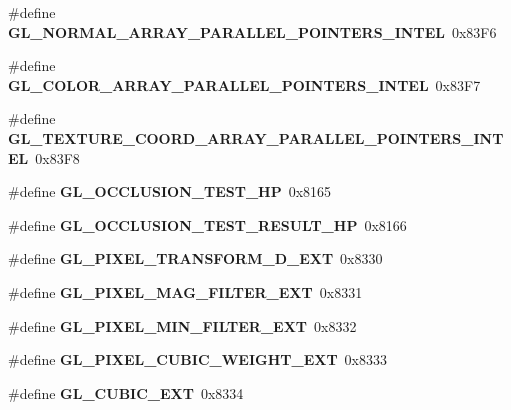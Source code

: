 \begin{DoxyCompactItemize}
\item 
\#define {\bfseries G\+L\+\_\+\+N\+O\+R\+M\+A\+L\+\_\+\+A\+R\+R\+A\+Y\+\_\+\+P\+A\+R\+A\+L\+L\+E\+L\+\_\+\+P\+O\+I\+N\+T\+E\+R\+S\+\_\+\+I\+N\+T\+E\+L}~0x83\+F6\label{_s_d_l__opengl_8h_af998ad9c6b8192793730388fa88a1c14}

\item 
\#define {\bfseries G\+L\+\_\+\+C\+O\+L\+O\+R\+\_\+\+A\+R\+R\+A\+Y\+\_\+\+P\+A\+R\+A\+L\+L\+E\+L\+\_\+\+P\+O\+I\+N\+T\+E\+R\+S\+\_\+\+I\+N\+T\+E\+L}~0x83\+F7\label{_s_d_l__opengl_8h_a2d930d0fab00c3cb5fc5a3f1e2e586d4}

\item 
\#define {\bfseries G\+L\+\_\+\+T\+E\+X\+T\+U\+R\+E\+\_\+\+C\+O\+O\+R\+D\+\_\+\+A\+R\+R\+A\+Y\+\_\+\+P\+A\+R\+A\+L\+L\+E\+L\+\_\+\+P\+O\+I\+N\+T\+E\+R\+S\+\_\+\+I\+N\+T\+E\+L}~0x83\+F8\label{_s_d_l__opengl_8h_a0a9de9b6448574f74ff594a64c760748}

\item 
\#define {\bfseries G\+L\+\_\+\+O\+C\+C\+L\+U\+S\+I\+O\+N\+\_\+\+T\+E\+S\+T\+\_\+\+H\+P}~0x8165\label{_s_d_l__opengl_8h_a22daf1b41f916066c813394a809f5109}

\item 
\#define {\bfseries G\+L\+\_\+\+O\+C\+C\+L\+U\+S\+I\+O\+N\+\_\+\+T\+E\+S\+T\+\_\+\+R\+E\+S\+U\+L\+T\+\_\+\+H\+P}~0x8166\label{_s_d_l__opengl_8h_a48c637394588fad4caebda85852798e4}

\item 
\#define {\bfseries G\+L\+\_\+\+P\+I\+X\+E\+L\+\_\+\+T\+R\+A\+N\+S\+F\+O\+R\+M\+\_\+D\+\_\+\+E\+X\+T}~0x8330\label{_s_d_l__opengl_8h_a6c4074d4f3e0b6aa35113ffcad89cbd4}

\item 
\#define {\bfseries G\+L\+\_\+\+P\+I\+X\+E\+L\+\_\+\+M\+A\+G\+\_\+\+F\+I\+L\+T\+E\+R\+\_\+\+E\+X\+T}~0x8331\label{_s_d_l__opengl_8h_aa536f703a10c6e1c98609d18eb5b27bb}

\item 
\#define {\bfseries G\+L\+\_\+\+P\+I\+X\+E\+L\+\_\+\+M\+I\+N\+\_\+\+F\+I\+L\+T\+E\+R\+\_\+\+E\+X\+T}~0x8332\label{_s_d_l__opengl_8h_ac2b3ac2968a9f963442a37068216c5b0}

\item 
\#define {\bfseries G\+L\+\_\+\+P\+I\+X\+E\+L\+\_\+\+C\+U\+B\+I\+C\+\_\+\+W\+E\+I\+G\+H\+T\+\_\+\+E\+X\+T}~0x8333\label{_s_d_l__opengl_8h_a5454d12e79b181328af7522c69894232}

\item 
\#define {\bfseries G\+L\+\_\+\+C\+U\+B\+I\+C\+\_\+\+E\+X\+T}~0x8334\label{_s_d_l__opengl_8h_ad3505a5b199601042b70096953dcea02}


\end{DoxyCompactItemize}
